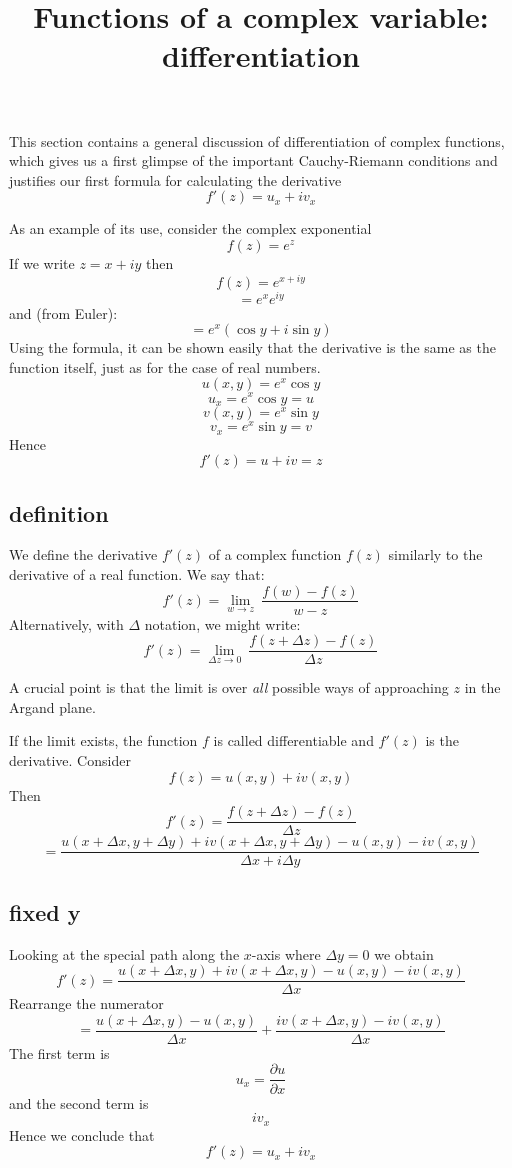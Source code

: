 \documentclass[11pt, oneside]{article}   	%
\title{Functions of a complex variable:  differentiation}
\date{}							%
\begin{document}
\maketitle
\Large
This section contains a general discussion of differentiation of complex functions, which gives us a first glimpse of the important Cauchy-Riemann conditions and justifies our first formula for calculating the derivative
\[ f'(z) = u_x + i v_x \]

As an example of its use, consider the complex exponential
\[ f(z) = e^z \]
If we write $z = x + iy$ then
\[ f(z) = e^{x + iy} \]
\[ = e^x e^{iy} \]
and (from Euler):
\[ = e^x (\cos y + i \sin y) \]
Using the formula, it can be shown easily that the derivative is the same as the function itself, just as for the case of real numbers.
\[ u(x,y) = e^x \cos y \]
\[ u_x = e^x \cos y = u \]
\[ v(x,y) = e^x \sin y \]
\[ v_x = e^x \sin y = v \]
Hence
\[f'(z) = u + iv = z \]

\subsection*{definition}
We define the derivative $f'(z)$ of a complex function $f(z)$ similarly to the derivative of a real function.  We say that:
\[ f'(z) = \lim_{w \rightarrow z} \ \frac{f(w) - f(z)}{w-z} \]
Alternatively, with $\Delta$ notation, we might write:
\[ f'(z) = \lim_{\Delta z \rightarrow 0} \ \frac{f(z + \Delta z) - f(z)}{\Delta z} \]

A crucial point is that the limit is over \emph{all} possible ways of approaching $z$ in the Argand plane.  

If the limit exists, the function $f$ is called differentiable and $f'(z)$ is the derivative.
Consider
\[ f(z) = u(x,y) + i v(x,y) \]
Then
\[ f'(z) = \frac{f(z + \Delta z) - f(z)}{\Delta z} \]
\[ = \frac{u(x + \Delta x, y + \Delta y) + i v (x + \Delta x, y + \Delta y) - u(x,y) - i v(x,y)}{\Delta x + i \Delta y} \]

\subsection*{fixed y}
Looking at the special path along the $x$-axis where $\Delta y = 0$ we obtain
\[ f'(z) = \frac{u(x + \Delta x, y) + i v (x + \Delta x, y) - u(x,y) - i v(x,y)}{\Delta x} \]
Rearrange the numerator
\[ = \frac{u(x + \Delta x, y) - u(x,y)}{\Delta x} + \frac{i v (x + \Delta x, y) - i v(x,y)}{\Delta x} \]
The first term is
\[ u_x = \frac{\partial u}{\partial x} \]
and the second term is 
\[ i v_x \]
Hence we conclude that
\[ f'(z) = u_x + i v_x \]
\end{document}

